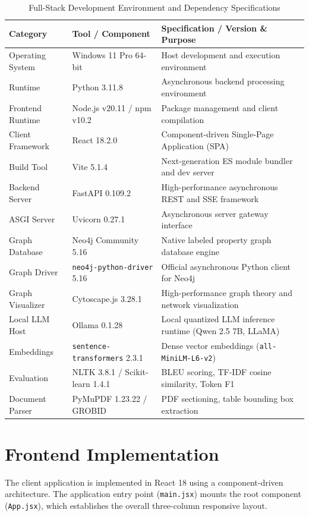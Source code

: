 \documentclass[12pt,a4paper,oneside]{report}
\begin{document}
\begin{table}[h]
\centering
\caption{Full-Stack Development Environment and Dependency Specifications}
\label{tab:dev_environment}
\small
\begin{tabular}{llp{7.5cm}}
\toprule
\textbf{Category} & \textbf{Tool / Component} & \textbf{Specification / Version \& Purpose} \\
\midrule
Operating System & Windows 11 Pro 64-bit & Host development and execution environment \\
Runtime & Python 3.11.8 & Asynchronous backend processing environment \\
Frontend Runtime & Node.js v20.11 / npm v10.2 & Package management and client compilation \\
Client Framework & React 18.2.0 & Component-driven Single-Page Application (SPA) \\
Build Tool & Vite 5.1.4 & Next-generation ES module bundler and dev server \\
Backend Server & FastAPI 0.109.2 & High-performance asynchronous REST and SSE framework \\
ASGI Server & Uvicorn 0.27.1 & Asynchronous server gateway interface \\
Graph Database & Neo4j Community 5.16 & Native labeled property graph database engine \\
Graph Driver & \texttt{neo4j-python-driver} 5.16 & Official asynchronous Python client for Neo4j \\
Graph Visualizer & Cytoscape.js 3.28.1 & High-performance graph theory and network visualization \\
Local LLM Host & Ollama 0.1.28 & Local quantized LLM inference runtime (Qwen 2.5 7B, LLaMA) \\
Embeddings & \texttt{sentence-transformers} 2.3.1 & Dense vector embeddings (\texttt{all-MiniLM-L6-v2}) \\
Evaluation & NLTK 3.8.1 / Scikit-learn 1.4.1 & BLEU scoring, TF-IDF cosine similarity, Token F1 \\
Document Parser & PyMuPDF 1.23.22 / GROBID & PDF sectioning, table bounding box extraction \\
\bottomrule
\end{tabular}
\end{table}

\section{Frontend Implementation}
The client application is implemented in React 18 using a component-driven architecture. The application entry point (\texttt{main.jsx}) mounts the root component (\texttt{App.jsx}), which establishes the overall three-column responsive layout.
\end{document}
